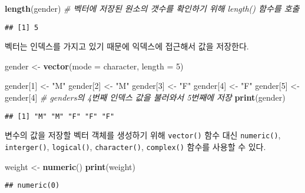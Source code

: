 \documentclass[
]{article}
\newenvironment{Shaded}{\begin{snugshade}}{\end{snugshade}}
\newcommand{\AttributeTok}[1]{\textcolor[rgb]{0.13,0.29,0.53}{#1}}
\newcommand{\CommentTok}[1]{\textcolor[rgb]{0.56,0.35,0.01}{\textit{#1}}}
\newcommand{\DecValTok}[1]{\textcolor[rgb]{0.00,0.00,0.81}{#1}}
\newcommand{\FunctionTok}[1]{\textcolor[rgb]{0.13,0.29,0.53}{\textbf{#1}}}
\newcommand{\NormalTok}[1]{#1}
\newcommand{\OtherTok}[1]{\textcolor[rgb]{0.56,0.35,0.01}{#1}}
\newcommand{\StringTok}[1]{\textcolor[rgb]{0.31,0.60,0.02}{#1}}
\begin{document}
\begin{Shaded}
\begin{Highlighting}[]
\FunctionTok{length}\NormalTok{(gender) }\CommentTok{\# 벡터에 저장된 원소의 갯수를 확인하기 위해 length() 함수를 호출}
\end{Highlighting}
\end{Shaded}

\begin{verbatim}
## [1] 5
\end{verbatim}

벡터는 인덱스를 가지고 있기 때문에 익덱스에 접근해서 값을 저장한다.

\begin{Shaded}
\begin{Highlighting}[]
\NormalTok{gender }\OtherTok{\textless{}{-}} \FunctionTok{vector}\NormalTok{(}\AttributeTok{mode =} \StringTok{\textquotesingle{}character\textquotesingle{}}\NormalTok{, }\AttributeTok{length =} \DecValTok{5}\NormalTok{)}

\NormalTok{gender[}\DecValTok{1}\NormalTok{] }\OtherTok{\textless{}{-}} \StringTok{"M"}
\NormalTok{gender[}\DecValTok{2}\NormalTok{] }\OtherTok{\textless{}{-}} \StringTok{"M"}
\NormalTok{gender[}\DecValTok{3}\NormalTok{] }\OtherTok{\textless{}{-}} \StringTok{"F"}
\NormalTok{gender[}\DecValTok{4}\NormalTok{] }\OtherTok{\textless{}{-}} \StringTok{"F"}
\NormalTok{gender[}\DecValTok{5}\NormalTok{] }\OtherTok{\textless{}{-}}\NormalTok{ gender[}\DecValTok{4}\NormalTok{] }\CommentTok{\# genders의 4번째 인덱스 값을 불러와서 5번째에 저장}
\FunctionTok{print}\NormalTok{(gender)}
\end{Highlighting}
\end{Shaded}

\begin{verbatim}
## [1] "M" "M" "F" "F" "F"
\end{verbatim}

변수의 값을 저장할 벡터 객체를 생성하기 위해 \texttt{vector()} 함수 대신
\texttt{numeric()}, \texttt{interger()}, \texttt{logical()},
\texttt{character()}, \texttt{complex()} 함수를 사용할 수 있다.

\begin{Shaded}
\begin{Highlighting}[]
\NormalTok{weight }\OtherTok{\textless{}{-}} \FunctionTok{numeric}\NormalTok{()}
\FunctionTok{print}\NormalTok{(weight)}
\end{Highlighting}
\end{Shaded}

\begin{verbatim}
## numeric(0)
\end{verbatim}
\end{document}
